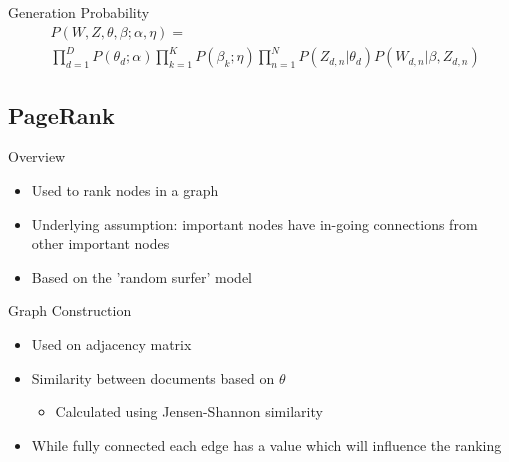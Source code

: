 \begin{frame}{\insertsubsection}{Generation Probability}
    \begin{align*}
        & P(W,Z,\theta,\beta;\alpha,\eta) = \\
        & \prod_{d=1}^{D}P(\theta_d;\alpha)
        \prod_{k=1}^{K}P(\beta_k;\eta)
        \prod_{n=1}^{N}P(Z_{d,n}|\theta_d) P(W_{d,n}|\beta, Z_{d,n})
    \end{align*}
\end{frame}


\subsection{PageRank}
\begin{frame}{\insertsubsection}{Overview}
    \begin{itemize}
        \item Used to rank nodes in a graph
        \item Underlying assumption: important nodes have in-going connections from other important nodes
        \item Based on the 'random surfer' model
    \end{itemize}
\end{frame}


\begin{frame}{\insertsubsection}{Graph Construction}
    \begin{itemize}
        \item Used on adjacency matrix
        \item Similarity between documents based on $\theta$
        \begin{itemize}
                    \item Calculated using Jensen-Shannon similarity
        \end{itemize}
        \item While fully connected each edge has a value which will influence the ranking
    \end{itemize}
\end{frame}